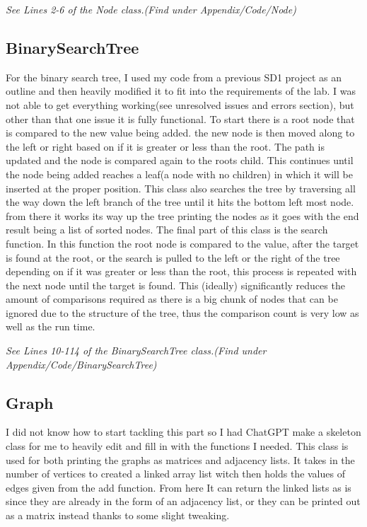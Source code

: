 \documentclass[10pt]{article}
\begin{document}
\newline

\emph{\normalfont 
See Lines 2-6 of the Node class.(Find under Appendix/Code/Node)}

\subsection{BinarySearchTree}
For the binary search tree, I used my code from a previous SD1 project as an outline and then heavily modified it to fit into the requirements of the lab. I was not able to get everything working(see unresolved issues and errors section), but other than that one issue it is fully functional. To start there is a root node that is compared to the new value being added. the new node is then moved along to the left or right based on if it is greater or less than the root. The path is updated and the node is compared again to the roots child. This continues until the node being added reaches a leaf(a node with no children) in which it will be inserted at the proper position. This class also searches the tree by traversing all the way down the left branch of the tree until it hits the bottom left most node. from there it works its way up the tree printing the nodes as it goes with the end result being a list of sorted nodes. The final part of this class is the search function. In this function the root node is compared to the value, after the target is found at the root, or the search is pulled to the left or the right of the tree depending on if it was greater or less than the root, this process is repeated with the next node until the target is found. This (ideally) significantly reduces the amount of comparisons required as there is a big chunk of nodes that can be ignored due to the structure of the tree, thus the comparison count is very low as well as the run time.

\newline

\emph{\normalfont 
See Lines 10-114 of the BinarySearchTree class.(Find under Appendix/Code/BinarySearchTree)}

\subsection{Graph}
I did not know how to start tackling this part so I had ChatGPT make a skeleton class for me to heavily edit and fill in with the functions I needed. This class is used for both printing the graphs as matrices and adjacency lists. It takes in the number of vertices to created a linked array list witch then holds the values of edges given from the add function. From here It can return the linked lists as is since they are already in the form of an adjacency list, or they can be printed out as a matrix instead thanks to some slight tweaking.
\end{document}
